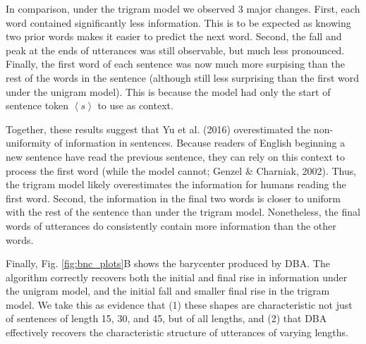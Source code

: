 \documentclass[10pt, letterpaper]{article}
\begin{document}
In comparison, under the trigram model we observed 3 major changes.
First, each word contained significantly less information. This is to be
expected as knowing two prior words makes it easier to predict the next
word. Second, the fall and peak at the ends of utterances was still
observable, but much less pronounced. Finally, the first word of each
sentence was now much more surpising than the rest of the words in the
sentence (although still less surprising than the first word under the
unigram model). This is because the model had only the start of sentence
token \(\left<s\right>\) to use as context.

Together, these results suggest that Yu et al. (2016) overestimated the
non-uniformity of information in sentences. Because readers of English
beginning a new sentence have read the previous sentence, they can rely
on this context to process the first word (while the model cannot;
Genzel \& Charniak, 2002). Thus, the trigram model likely overestimates
the information for humans reading the first word. Second, the
information in the final two words is closer to uniform with the rest of
the sentence than under the trigram model. Nonetheless, the final words
of utterances do consistently contain more information than the other
words.

Finally, Fig. \ref{fig:bnc_plots}B shows the barycenter produced by DBA.
The algorithm correctly recovers both the initial and final rise in
information under the unigram model, and the initial fall and smaller
final rise in the trigram model. We take this as evidence that (1) these
shapes are characteristic not just of sentences of length 15, 30, and
45, but of all lengths, and (2) that DBA effectively recovers the
characteristic structure of utterances of varying lengths.
\end{document}
